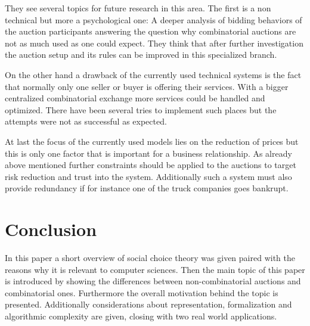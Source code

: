 \documentclass[a4paper]{paper}
\begin{document}
They see several topics for future research in this area. The first is a non technical but more a psychological one: A deeper analysis of bidding behaviors of the auction participants answering the question why combinatorial auctions are not as much used as one could expect. They think that after further investigation the auction setup and its rules can be improved in this specialized branch.

On the other hand a drawback of the currently used technical systems is the fact that normally only one seller or buyer is offering their services. With a bigger centralized combinatorial exchange more services could be handled and optimized. There have been several tries to implement such places but the attempts were not as successful as expected.

At last the focus of the currently used models lies on the reduction of prices but this is only one factor that is important for a business relationship. As already above mentioned further constraints should be applied to the auctions to target risk reduction and trust into the system. Additionally such a system must also provide redundancy if for instance one of the truck companies goes bankrupt. 

\section{Conclusion}

In this paper a short overview of social choice theory was given paired with the reasons why it is relevant to computer sciences. Then the main topic of this paper is introduced by showing the differences between non-combinatorial auctions and combinatorial ones. Furthermore the overall motivation behind the topic is presented. Additionally considerations about representation, formalization and algorithmic complexity are given, closing with two real world applications. 


\end{document}
